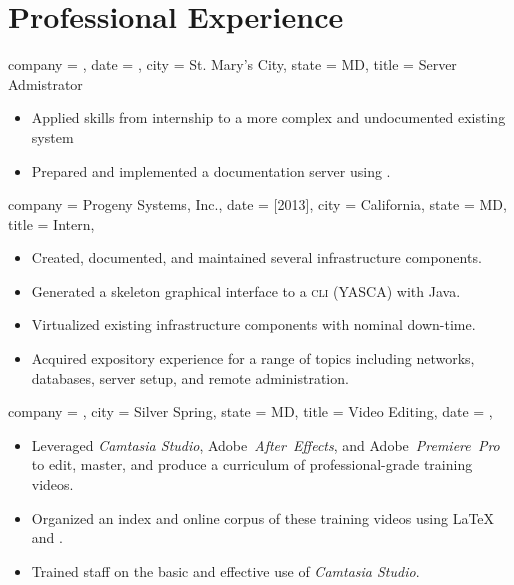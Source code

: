 \documentclass{bettercv}
\newcommand \software[1] {\textsl{#1}}
\begin{document}
\section{Professional Experience}

\begin{position}
  {
    company = \smcmmathcs,
    date    = ,
    city    = St. Mary's City,
    state   = MD,
    title   = Server Admistrator
  }

\begin{itemize}
\item Applied skills from internship to a more complex and undocumented existing system
\item Prepared and implemented a documentation server using \redmine.
\end{itemize}
\end{position}

\begin{position}
  {
    company = {Progeny Systems, Inc.},
    date    = [2013],
    city    = California,
    state   = MD,
    title   = Intern,
  }

\begin{itemize}
\item Created, documented, and maintained several infrastructure components.
\item Generated a skeleton graphical interface to a \textsc{cli} (YASCA) with Java.
\item Virtualized existing infrastructure components with nominal down-time.
\item Acquired expository experience for a range of topics including
  networks,
  databases,
  server setup, and
  remote administration.
\end{itemize}
\end{position}

\begin{position}
  {
    company = \cwc,
    city    = Silver Spring,
    state   = MD,
    title   = Video Editing,
    date    = ,
  }

\begin{itemize}
\item Leveraged \software{Camtasia Studio},
  Adobe~\software{After~Effects}, and
  Adobe~\software{Premiere~Pro} to edit, master, and produce
  a curriculum of professional-grade training videos.
\item Organized an index and online corpus of these training videos using \LaTeX{} and \mindflash.
\item Trained staff on the basic and effective use of \software{Camtasia Studio}.
\end{itemize}
\end{position}
\end{document}
